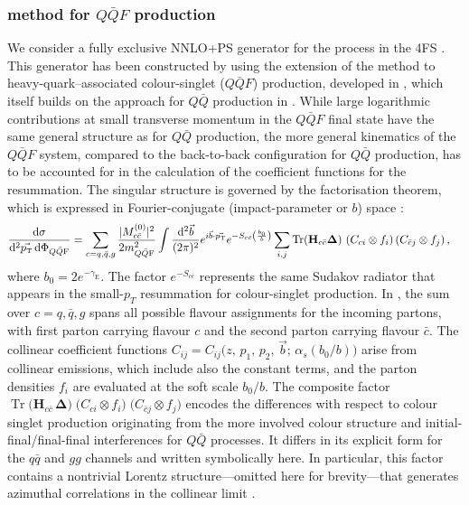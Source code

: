 \documentclass[11pt,a4paper]{article}
\DeclareMathOperator{\Tr}{Tr}
\begin{document}
\subsubsection{\minnlo{} method for $Q\bar Q F$ production}\label{sec:bbH4FS}

We consider a fully exclusive NNLO+PS generator for the \bbH{} process in the 4FS \cite{Biello:2024pgo}.  This generator has been constructed by using 
the extension of the \minnlo{} method to heavy-quark–associated colour-singlet ($Q\bar{Q}F$) production, developed in , 
which itself builds on the \minnlo{} approach for $Q\bar{Q}$ production in . 
While large logarithmic contributions at small transverse momentum in the $Q\bar{Q}F$ final state have the same 
general structure as for $Q\bar{Q}$ production, the more general kinematics of the $Q\bar{Q}F$ system, compared to the back-to-back configuration
for $Q\bar Q$ production, has to be accounted for in the calculation of the coefficient functions for the resummation. The singular structure is governed
by the factorisation theorem, which is expressed in Fourier-conjugate (impact-parameter or $b$) space \cite{Zhu:2012ts,Li:2013mia,Catani:2014qha,Catani:2018mei}:
\begin{align}\label{eq:facformula}
        \frac{\mathd \sigma}{ \mathd^2\vec{\pt}\, \mathd \Phi_{Q\bar{Q}{\rm F}}}&=\sum_{c=q,\bar{q},g}
  \frac{|M^{(0)}_{c\bar{c}}|^2}{2 m_{Q\bar{Q}{\rm F}}^2 }\int\frac{ \mathd^2\vec{b}}{(2\pi)^2} e^{i \vec{b}\cdot
  \vec{\pt} } e^{-S_{c\bar{c}} \left(\frac{b_0}{b}\right)}\sum_{i,j} \Tr({\mathbf H}_{c\bar{c}}{\mathbf \Delta})\,\,
  ({C}_{ci}\otimes f_i) \,({C}_{\bar{c} j}\otimes f_j) \,,
\end{align}
where $b_0=2 e^{-\gamma_\text{E}}$. The factor $e^{-S_{c\bar{c}}}$ represents the same Sudakov radiator that appears in the small-$p_{T}$ resummation for 
colour-singlet production.  In , the sum over $c=q,\bar{q},g$ spans all possible flavour assignments for the incoming partons, with first parton carrying flavour $c$ and the second parton carrying flavour $\bar{c}$. The collinear coefficient functions
$C_{ij} = C_{ij}\bigl(z,\,p_{1},\,p_{2},\,\vec{b};\,\alpha_{s}(b_{0}/b)\bigr)$ arise from collinear emissions, which include
also the constant terms, and the parton densities $f_{i}$ are evaluated at the soft scale $b_{0}/b$.  The composite factor
$\Tr\bigl({\mathbf H}_{c\bar{c}}\,{\mathbf \Delta}\bigr)\;\bigl(C_{ci}\otimes f_{i}\bigr)\;\bigl(C_{\bar{c}j}\otimes f_{j}\bigr)$
encodes the differences with respect to colour singlet production originating from the more involved colour structure 
and initial-final/final-final interferences for $Q\bar{Q}$ processes. It differs in its explicit form for the $q\bar{q}$ and $gg$ channels and written symbolically here.
 In particular, this factor contains a nontrivial Lorentz structure—omitted here for brevity—that generates azimuthal correlations in the collinear limit \cite{Catani:2010pd,Catani:2014qha}.
\end{document}

